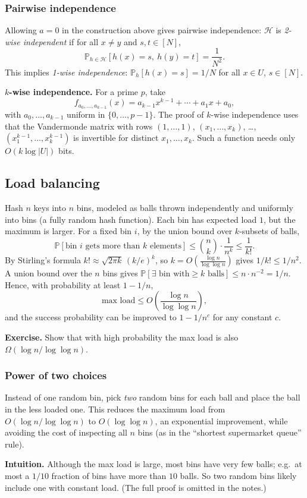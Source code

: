 \subsubsection{Pairwise independence}
 
Allowing $a=0$ in the construction above gives pairwise independence: $\mathcal{H}$ is \emph{2-wise independent} if for all $x\neq y$ and $s,t\in[N]$,
\[
  \mathbb{P}_{h\in\mathcal{H}}[h(x)=s,\ h(y)=t]=\frac1{N^2}.
\]
This implies \emph{1-wise independence}: $\mathbb{P}_{h}[h(x)=s]=1/N$ for all $x\in U$, $s\in[N]$.
 
\textbf{$k$-wise independence.} For a prime $p$, take
\[
  f_{a_0,\ldots,a_{k-1}}(x)=a_{k-1}x^{k-1}+\cdots+a_1x+a_0,
\]
with $a_0,\ldots,a_{k-1}$ uniform in $\{0,\ldots,p-1\}$. The proof of $k$-wise independence uses that the Vandermonde matrix with rows $(1,\ldots,1)$, $(x_1,\ldots,x_k)$, \ldots, $(x_1^{k-1},\ldots,x_k^{k-1})$ is invertible for distinct $x_1,\ldots,x_k$. Such a function needs only $O(k\log|U|)$ bits.
 
\subsection{Load balancing}
 
Hash $n$ keys into $n$ bins, modeled as balls thrown independently and uniformly into bins (a fully random hash function). Each bin has expected load $1$, but the maximum is larger. For a fixed bin $i$, by the union bound over $k$-subsets of balls,
\[
  \mathbb{P}[\text{bin } i \text{ gets more than } k \text{ elements}]\le\binom nk\cdot\frac1{n^k}\le\frac1{k!}.
\]
By Stirling's formula $k!\approx\sqrt{2\pi k}\,(k/e)^k$, so $k=O\!\left(\frac{\log n}{\log\log n}\right)$ gives $1/k!\le1/n^2$. A union bound over the $n$ bins gives $\mathbb{P}[\exists\text{ bin with}\ge k\text{ balls}]\le n\cdot n^{-2}=1/n$. Hence, with probability at least $1-1/n$,
\[
  \text{max load}\le O\!\left(\frac{\log n}{\log\log n}\right),
\]
and the success probability can be improved to $1-1/n^c$ for any constant $c$.
 
\textbf{Exercise.} Show that with high probability the max load is also $\Omega(\log n/\log\log n)$.
 
\subsubsection{Power of two choices}
 
Instead of one random bin, pick \emph{two} random bins for each ball and place the ball in the less loaded one. This reduces the maximum load from $O(\log n/\log\log n)$ to $O(\log\log n)$, an exponential improvement, while avoiding the cost of inspecting all $n$ bins (as in the ``shortest supermarket queue'' rule).
 
\textbf{Intuition.} Although the max load is large, most bins have very few balls; e.g.\ at most a $1/10$ fraction of bins have more than $10$ balls. So two random bins likely include one with constant load. (The full proof is omitted in the notes.)
% 
